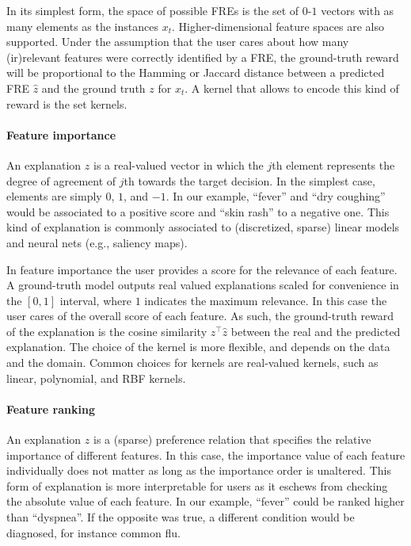 \documentclass[letterpaper]{article} %
\begin{document}
In its simplest form, the space of possible FREs is the set of $0$-$1$ vectors with as many elements as the instances $x_t$. Higher-dimensional feature spaces are also supported.  Under the assumption that the user cares about how many (ir)relevant features were correctly identified by a FRE, the ground-truth reward will be proportional to the Hamming or Jaccard distance between a predicted FRE $\hat{z}$ and the ground truth $z$ for $x_t$.  A kernel that allows to encode this kind of reward is the set kernels.


\paragraph{Feature importance}  An explanation $z$ is a real-valued vector in which the $j$th element represents the degree of agreement of $j$th towards the target decision.  In the simplest case, elements are simply $0$, $1$, and $-1$.  In our example, ``fever'' and ``dry coughing'' would be associated to a positive score and ``skin rash'' to a negative one.  This kind of explanation is commonly associated to (discretized, sparse) linear models and neural nets (e.g., saliency maps).

In feature importance the user provides a score for the relevance of each feature. A ground-truth model outputs real valued explanations scaled for convenience in the $[0,1]$ interval, where $1$ indicates the maximum relevance. In this case the user cares of the overall score of each feature. As such, the ground-truth reward of the explanation is the cosine similarity $z^\top\hat{z}$ between the real and the predicted explanation.
The choice of the kernel is more flexible, and depends on the data and the domain. Common choices for kernels are real-valued kernels, such as linear, polynomial, and RBF kernels. 


\paragraph{Feature ranking} An explanation $z$ is a (sparse) preference relation that specifies the relative importance of different features. In this case, the importance value of each feature individually does not matter as long as the importance order is unaltered. This form of explanation is more interpretable for users as it eschews from checking the absolute value of each feature.  In our example, ``fever'' could be ranked higher than ``dyspnea''.  If the opposite was true, a different condition would be diagnosed, for instance common flu.
\end{document}
